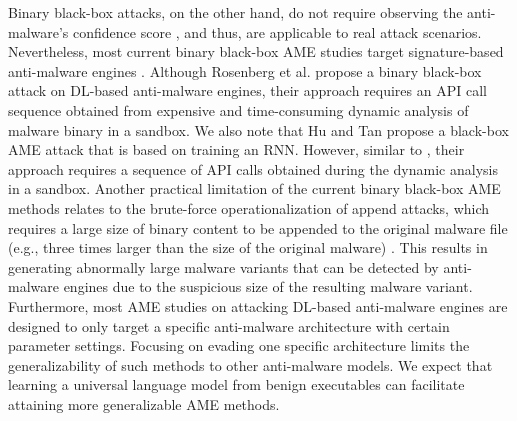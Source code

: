 \documentclass[letterpaper]{article}
\begin{document}
    Binary black-box attacks, on the other hand, do not require observing the anti-malware's confidence score \cite{dey2019evadepdf,fang2019evading,rosenberg2019defense,anderson2018learning}, and thus, are applicable to real attack scenarios. Nevertheless, most current binary black-box AME studies target signature-based anti-malware engines \cite{dey2019evadepdf,fang2019evading,anderson2018learning}. Although Rosenberg et al. \cite{rosenberg2019defense} propose a binary black-box attack on DL-based anti-malware engines, their approach requires an API call sequence obtained from expensive and time-consuming dynamic analysis of malware binary in a sandbox. We also note that Hu and Tan \cite{hu2018black} propose a black-box AME attack that is based on training an RNN. However, similar to \cite{rosenberg2019defense}, their approach requires a sequence of API calls obtained during the dynamic analysis in a sandbox. Another practical limitation of the current binary black-box AME methods relates to the brute-force operationalization of append attacks, which requires a large size of binary content to be appended to the original malware file (e.g., three times larger than the size of the original malware) \cite{suciu2019exploring,castroandschmitt2019armed}. This results in generating abnormally large malware variants that can be detected by anti-malware engines due to the suspicious size of the resulting malware variant. Furthermore, most AME studies on attacking DL-based anti-malware engines are designed to only target a specific anti-malware architecture with certain parameter settings. Focusing on evading one specific architecture limits the generalizability of such methods to other anti-malware models. We expect that learning a universal language model from benign executables can facilitate attaining more generalizable AME methods.
\end{document}

